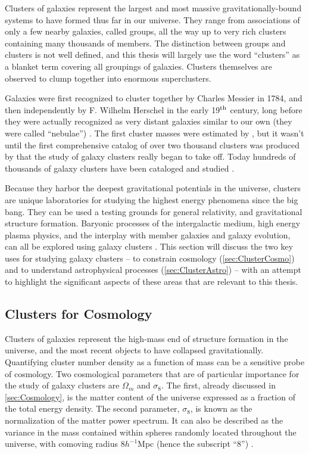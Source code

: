 Clusters of galaxies represent the largest and most massive gravitationally-bound systems to have formed thus far in our universe. They range from associations of only a few nearby galaxies, called groups, all the way up to very rich clusters containing many thousands of members. The distinction between groups and clusters is not well defined, and this thesis will largely use the word ``clusters'' as a blanket term covering all groupings of galaxies. Clusters themselves are observed to clump together into enormous superclusters.

Galaxies were first recognized to cluster together by Charles Messier in 1784, and then independently by F. Wilhelm Herschel in the early 19$^{\rm th}$ century, long before they were actually recognized as very distant galaxies similar to our own (they were called ``nebulae'') \citep{Biviano00}. The first cluster masses were estimated by \citet{Zwicky33}, but it wasn't until the first comprehensive catalog of over two thousand clusters was produced by \citet{Abell58} that the study of galaxy clusters really began to take off. Today hundreds of thousands of galaxy clusters have been cataloged and studied \citep[see e.g.][]{Wen12}.

Because they harbor the deepest gravitational potentials in the universe, clusters are unique laboratories for studying the highest energy phenomena since the big bang. They can be used a testing grounds for general relativity, and gravitational structure formation. Baryonic processes of the intergalactic medium, high energy plasma physics, and the interplay with member galaxies and galaxy evolution, can all be explored using galaxy clusters \citep{Kravtsov12}. This section will discuss the two key uses for studying galaxy clusters -- to constrain cosmology (\autoref{sec:ClusterCosmo}) and to understand astrophysical processes (\autoref{sec:ClusterAstro}) -- with an attempt to highlight the significant aspects of these areas that are relevant to this thesis.

\subsection{Clusters for Cosmology}
\label{sec:ClusterCosmo}
Clusters of galaxies represent the high-mass end of structure formation in the universe, and the most recent objects to have collapsed gravitationally. Quantifying cluster number density as a function of mass can be a sensitive probe of cosmology. Two cosmological parameters that are of particular importance for the study of galaxy clusters are $\Omega_m$ and $\sigma_8$. The first, already discussed in \autoref{sec:Cosmology}, is the matter content of the universe expressed as a fraction of the total energy density. The second parameter, $\sigma_8$, is known as the normalization of the matter power spectrum. It can also be described as the variance in the mass contained within spheres randomly located throughout the universe, with comoving radius $8 h^{-1}$Mpc (hence the subscript ``8'') \citep{Voit05}.

